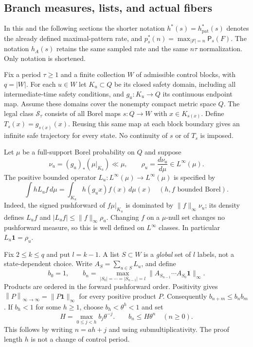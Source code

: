 \documentclass[11pt,reqno]{amsart}
\numberwithin{equation}{section}
\theoremstyle{definition}
\newcommand{\Patt}{\mathsf P}
\newcommand{\hpat}{h_{\mathrm{pat}}^{*}}
\newcommand{\one}{\mathbf 1}
\newcommand{\opnorm}[1]{\left\|#1\right\|_{\infty\to\infty}}
\begin{document}
\subsection{Branch measures, lists, and actual fibers}
In this and the following sections the shorter notation
$h^*(s)=\hpat(s)$ denotes the already defined maximal-pattern
rate, and $p_s^*(n)=\max_{|F|=n}\Patt_s(F)$. The notation
$h_A(s)$ retains the same sampled rate and the same $n\tau$
normalization. Only notation is shortened.

Fix a period $\tau\ge1$ and a finite collection $W$ of admissible
control blocks, with $q=|W|$. For each $u\in W$ let $K_u\subset Q$
be its closed safety domain, including all intermediate-time safety
conditions, and $g_u:K_u\to Q$ its continuous endpoint map.
Assume these domains cover the nonempty compact metric space $Q$.
The legal class $\mathcal S_\tau$ consists of all Borel maps
$s:Q\to W$ with $x\in K_{s(x)}$. Define
$T_s(x)=g_{s(x)}(x)$. Reusing this same map at each block boundary
gives an infinite safe trajectory for every state. No continuity of
$s$ or of $T_s$ is imposed.

Let $\mu$ be a full-support Borel probability on $Q$ and suppose
\begin{equation}\label{eq:cap-density}
 \nu_u=(g_u)_*(\mu|_{K_u})\ll\mu,\qquad
 \rho_u=\frac{d\nu_u}{d\mu}\in L^\infty(\mu).
\end{equation}
The positive bounded operator $L_u:L^\infty(\mu)\to L^\infty(\mu)$
is specified by
\begin{equation}\label{eq:cap-transfer}
 \int hL_uf\,d\mu=\int_{K_u}h(g_ux)f(x)\,d\mu(x)
 \quad(h,f\text{ bounded Borel}).
\end{equation}
Indeed, the signed pushforward of $f\mu|_{K_u}$ is dominated by
$\|f\|_\infty\nu_u$; its density defines $L_uf$ and
$|L_uf|\le\|f\|_\infty\rho_u$. Changing $f$ on a $\mu$-null
set changes no pushforward measure, so this is well defined on
$L^\infty$ classes. In particular $L_u\one=\rho_u$.

Fix $2\le k\le q$ and put $l=k-1$. A list $S\subset W$ is a
\emph{global} set of $l$ labels, not a state-dependent choice.
Write $A_S=\sum_{u\in S}L_u$, and define
\begin{equation}\label{eq:cap-bn}
 b_0=1,\qquad
 b_n=\max_{|S_0|=\cdots=|S_{n-1}|=l}
 \|A_{S_{n-1}}\cdots A_{S_0}\one\|_\infty.
\end{equation}
Products are ordered in the forward pushforward order. Positivity gives
$\opnorm{P}=\|P\one\|_\infty$ for every positive product $P$.
Consequently $b_{n+m}\le b_nb_m$. If $b_h<1$ for some $h\ge1$,
choose $b_h<\theta^h<1$ and set
\begin{equation}\label{eq:cap-exp}
 H=\max_{0\le j<h}b_j\theta^{-j}.
 \qquad b_n\le H\theta^n\quad(n\ge0).
\end{equation}
This follows by writing $n=ah+j$ and using submultiplicativity.
The proof length $h$ is not a change of control period.
\end{document}
